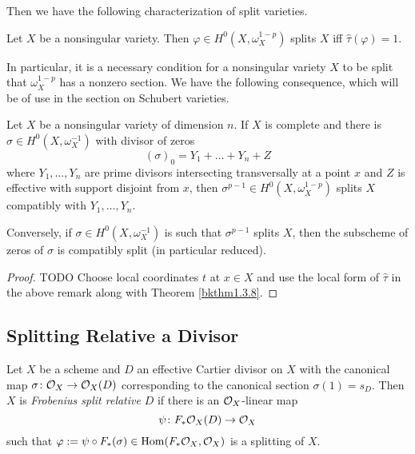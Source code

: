 \documentclass[12pt]{article}
\begin{document}
Then we have the following characterization of split varieties.
\begin{thm}\label{bkthm1.3.8}
    Let $X$ be a nonsingular variety. Then $\varphi \in H^0(X, \omega_X^{1-p})$ splits $X$ iff $\hat{\tau}(\varphi) = 1$.
\end{thm}
In particular, it is a necessary condition for a nonsingular variety $X$ to be split that $\omega_X^{1-p}$ has a nonzero section. We have the following consequence, which will be of use in the section on Schubert varieties.
\begin{prop}\label{bkprop1.3.11}
    Let $X$ be a nonsingular variety of dimension $n$. If $X$ is complete and there is $\sigma \in H^0(X, \omega_X^{-1})$ with divisor of zeros 
    \[(\sigma)_0 = Y_1 + \ldots + Y_n + Z\]
    where $Y_1,\ldots,Y_n$ are prime divisors intersecting transversally at a point $x$ and $Z$ is effective with support disjoint from $x$, then $\sigma^{p-1} \in H^0(X,\omega_X^{1-p})$ splits $X$ compatibly with $Y_1,\ldots,Y_n$.

    Conversely, if $\sigma \in H^0(X, \omega_X^{-1})$ is such that $\sigma^{p-1}$ splits $X$, then the subscheme of zeros of $\sigma$ is compatibly split (in particular reduced).
\end{prop}
\begin{proof}
    TODO Choose local coordinates $t$ at $x \in X$ and use the local form of $\hat{\tau}$ in the above remark along with Theorem \ref{bkthm1.3.8}.
\end{proof}

\subsection{Splitting Relative a Divisor}

\begin{defn}
    Let $X$ be a scheme and $D$ an effective Cartier divisor on $X$ with the canonical map $\sigma \colon \mathcal{O}_X \to \mathcal{O}_X(D)$ corresponding to the canonical section $\sigma(1) = s_D$. Then $X$ is \textit{Frobenius split relative} $D$ if there is an $\mathcal{O}_X$-linear map
    \[\psi \colon F_* \mathcal{O}_X(D) \to \mathcal{O}_X\]
    such that $\varphi := \psi \circ F_*(\sigma) \in \operatorname{Hom}(F_* \mathcal{O}_X, \mathcal{O}_X)$ is a splitting of $X$.
\end{defn}
\end{document}
